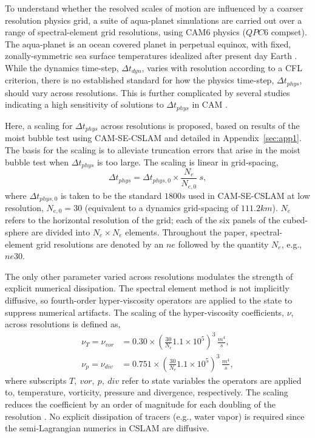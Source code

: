 \documentclass{agujournal}
\begin{document}
To understand whether the resolved scales of motion are influenced by a coarser resolution physics grid, a suite of aqua-planet simulations \citep{NH2000ASL,MWO2016JAMES} are carried out over a range of spectral-element grid resolutions, using CAM6 physics ($QPC6$ compset). The aqua-planet is an ocean covered planet in perpetual equinox, with fixed, zonally-symmetric sea surface temperatures idealized after present day Earth \citep[$QOBS$ in][]{NH2000ASL}. While the dynamics time-step, $\Delta t_{dyn}$, varies with resolution according to a CFL criterion, there is no established standard for how the physics time-step, $\Delta t_{phys}$, should vary across resolutions. This is further complicated by several studies indicating a high sensitivity of solutions to $\Delta t_{phys}$ in CAM  \citep{WO2003QJR,W2013QJRMS,WETAL2015JAMES,HR2018JAMES}.

Here, a scaling for $\Delta t_{phys}$ across resolutions is proposed, based on results of the moist bubble test \citep{HR2018JAMES} using CAM-SE-CSLAM and detailed in Appendix~\ref{sec:app1}. The basis for the scaling is to alleviate truncation errors that arise in the moist bubble test when $\Delta t_{phys}$ is too large. The scaling is linear in grid-spacing,
\begin{equation}
\Delta t_{phys} = \Delta t_{phys,0} \times \frac{N_e}{N_{e,0}}~s,\label{eq:dt-scale}
\end{equation}
where $\Delta t_{phys,0}$ is taken to be the standard $1800 s$ used in CAM-SE-CSLAM at low resolution, $N_{e,0} = 30$ (equivalent to a dynamics grid-spacing of $111.2km$). $N_e$ refers to the horizontal resolution of the grid; each of the six panels of the cubed-sphere are divided into $N_e \times N_e$ elements. Throughout the paper, spectral-element grid resolutions are denoted by an $ne$ followed by the quantity $N_e$, e.g., $ne30$.

The only other parameter varied across resolutions modulates the strength of explicit numerical dissipation. The spectral element method is not implicitly diffusive, so fourth-order hyper-viscosity operators are applied to the state to suppress numerical artifacts. The scaling of the hyper-viscosity coefficients, $\nu$, across resolutions is defined as,
\begin{align}
\nu_T = \nu_{vor} &= 0.30\times \left(\frac{30}{N_e}1.1\times 10^5\right)^3\, \frac{m^4}{s}, \\
\nu_p = \nu_{div} &= 0.751\times \left(\frac{30}{N_e}1.1\times 10^5\right)^3\, \frac{m^4}{s},
\label{eq:hypervis}
\end{align}
where subscripts $T,~vor,~p,~div$ refer to state variables the operators are applied to, temperature, vorticity, pressure and divergence, respectively. The scaling reduces the coefficient by an order of magnitude for each doubling of the resolution \citep[as in][]{LetAl2018JAMES}. No explicit dissipation of tracers (e.g., water vapor) is required since the semi-Lagrangian numerics in CSLAM are diffusive.
\end{document}
